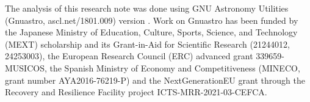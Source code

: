 \documentclass[preprint2, times, twocolappendix]{aastex631}
\begin{document}
The analysis of this research note was done using GNU Astronomy Utilities (Gnuastro, ascl.net/1801.009) version \gnuastroversion. Work on Gnuastro has been funded by the Japanese Ministry of Education, Culture, Sports, Science, and Technology (MEXT) scholarship and its Grant-in-Aid for Scientific Research (21244012, 24253003), the European Research Council (ERC) advanced grant 339659-MUSICOS, the Spanish Ministry of Economy and Competitiveness (MINECO, grant number AYA2016-76219-P) and the NextGenerationEU grant through the Recovery and Resilience Facility project ICTS-MRR-2021-03-CEFCA.

{}


\end{document}
